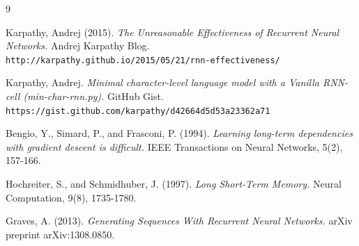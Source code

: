 \documentclass{article}
\begin{document}
\begin{thebibliography}{9}

Karpathy, Andrej (2015). \textit{The Unreasonable Effectiveness of Recurrent Neural Networks.} Andrej Karpathy Blog. \texttt{http://karpathy.github.io/2015/05/21/rnn-effectiveness/}

Karpathy, Andrej. \textit{Minimal character-level language model with a Vanilla RNN-cell (min-char-rnn.py).} GitHub Gist. \texttt{https://gist.github.com/karpathy/d42664d5d53a23362a71}

Bengio, Y., Simard, P., and Frasconi, P. (1994). \textit{Learning long-term dependencies with gradient descent is difficult.} IEEE Transactions on Neural Networks, 5(2), 157-166.

Hochreiter, S., and Schmidhuber, J. (1997). \textit{Long Short-Term Memory.} Neural Computation, 9(8), 1735-1780.

Graves, A. (2013). \textit{Generating Sequences With Recurrent Neural Networks.} arXiv preprint arXiv:1308.0850.

\end{thebibliography}
\end{document}
